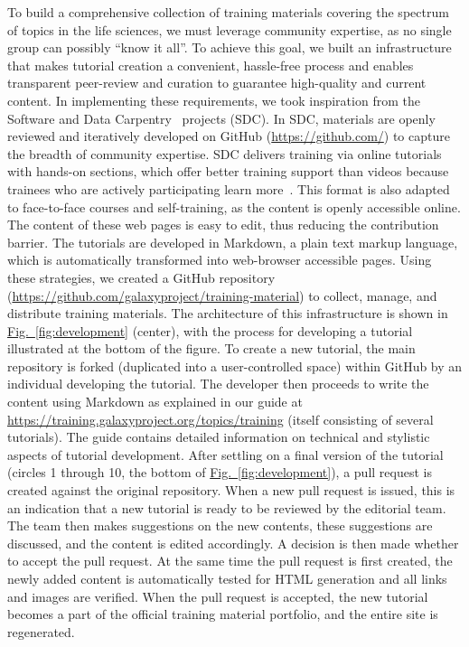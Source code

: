 To build a comprehensive collection of training materials covering the spectrum of topics in the life sciences, we must leverage community expertise, as no single group can possibly “know it all”. To achieve this goal, we built an infrastructure that makes tutorial creation a convenient, hassle-free process and enables transparent peer-review and curation to guarantee high-quality and current content. In implementing these requirements, we took inspiration from the Software and Data Carpentry~\cite{wilson2014software} projects (SDC). In SDC, materials are openly reviewed and iteratively developed on GitHub (\url{https://github.com/}) to capture the breadth of community expertise. SDC delivers training via online tutorials with hands-on sections, which offer better training support than videos because trainees who are actively participating learn more~\cite{dollar2007enhancing}.
This format is also adapted to face-to-face courses and self-training, as the content is openly accessible online. The content of these web pages is easy to edit, thus reducing the contribution barrier. The tutorials are developed in Markdown, a plain text markup language, which is automatically transformed into web-browser accessible pages. Using these strategies, we created a GitHub repository (\url{https://github.com/galaxyproject/training-material}) to collect, manage, and distribute training materials.
The architecture of this infrastructure is shown in \hyperref[fig:development]{Fig.~\ref{fig:development}} (center), with the process for developing a tutorial illustrated at the bottom of the figure. To create a new tutorial, the main repository is forked (duplicated into a user-controlled space) within GitHub by an individual developing the tutorial. The developer then proceeds to write the content using Markdown as explained in our guide at \url{https://training.galaxyproject.org/topics/training} (itself consisting of several tutorials). The guide contains detailed information on technical and stylistic aspects of tutorial development.
After settling on a final version of the tutorial (circles 1 through 10, the bottom of \hyperref[fig:development]{Fig.~\ref{fig:development}}), a pull request is created against the original repository. When a new pull request is issued, this is an indication that a new tutorial is ready to be reviewed by the editorial team. The team then makes suggestions on the new contents, these suggestions are discussed, and the content is edited accordingly. A decision is then made whether to accept the pull request. At the same time the pull request is first created, the newly added content is automatically tested for HTML generation and all links and images are verified. When the pull request is accepted, the new tutorial becomes a part of the official training material portfolio, and the entire site is regenerated.

